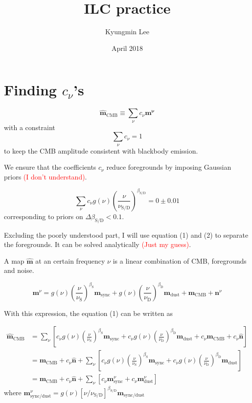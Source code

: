\documentclass[11pt]{article}
\title{ILC practice}
\author{Kyungmin Lee}
\date{April 2018}
\begin{document}
\maketitle

\section{Finding $c_{\nu}$'s}

\begin{equation}
    \mathbf{\hat{m}}_{\text{CMB}} \equiv \sum_{\nu} c_{\nu}\mathbf{m^{\nu}}
\end{equation}
with a constraint
\begin{equation}
    \sum_{\nu} c_{\nu} = 1
\end{equation}
to keep the CMB amplitude consistent with blackbody emission.

We ensure that the coefficients $c_\nu$ reduce foregrounds by imposing Gaussian priors \textcolor{red}{(I don't understand)}.

\begin{equation}
    \sum_{\nu} c_{\nu} g(\nu) \left( \frac{\nu}{\nu_\text{S/D}} \right)^{\beta_{\text{S/D}}} = 0 \pm 0.01
\end{equation}
corresponding to priors on $\Delta \beta_{\text{S/D}} < 0.1$. 

Excluding the poorly understood part, I will use equation (1) and (2) to separate the foregrounds. It can be solved analytically \textcolor{red}{(Just my guess)}.

A map $\mathbf{\hat{m}}$ at an certain frequency $\nu$ is a linear combination of CMB, foregrounds and noise. 

\begin{equation}
    \mathbf{m}^{\nu} = g(\nu)\left(\frac{\nu}{\nu_{\text{S}}}\right)^{\beta_\text{S}}\mathbf{m}_\text{sync} + 
    g(\nu)\left(\frac{\nu}{\nu_{\text{D}}}\right)^{\beta_\text{D}}\mathbf{m}_\text{dust} +
    \mathbf{m}_\text{CMB} +
    \mathbf{n}^\nu
\end{equation}

With this expression, the equation (1) can be written as

\begin{align}
    \mathbf{\hat{m}}_{\text{CMB}} &= \sum_\nu \left[
    c_\nu g(\nu)\left(\frac{\nu}{\nu_{\text{S}}}\right)^{\beta_\text{S}}\mathbf{m}_\text{sync} +
    c_\nu g(\nu)\left(\frac{\nu}{\nu_{\text{D}}}\right)^{\beta_\text{D}}\mathbf{m}_\text{dust} +
    c_\nu \mathbf{m}_{\text{CMB}} +
    c_\nu \mathbf{\hat{n}}
    \right] \\
    &= \mathbf{m}_{\text{CMB}}+
    c_\nu \mathbf{\hat{n}}+
    \sum_\nu
    \left[
    c_\nu g(\nu)\left(\frac{\nu}{\nu_{\text{S}}}\right)^{\beta_\text{S}}\mathbf{m}_\text{sync} +
    c_\nu g(\nu)\left(\frac{\nu}{\nu_{\text{D}}}\right)^{\beta_\text{D}}\mathbf{m}_\text{dust} 
    \right] \\
    &= \mathbf{m}_{\text{CMB}}+
    c_\nu \mathbf{\hat{n}}+
    \sum_\nu
    \left[
    c_\nu \mathbf{m}_\text{sync}^\nu +
    c_\nu \mathbf{m}_\text{dust}^\nu 
    \right]
\end{align}
where $\mathbf{m}_{\text{sync/dust}}^{\nu}=g(\nu)[\nu/\nu_{\text{S/D}}]^{\beta_{\text{S/D}}}\mathbf{m}_{\text{sync/dust}}$
\end{document}
